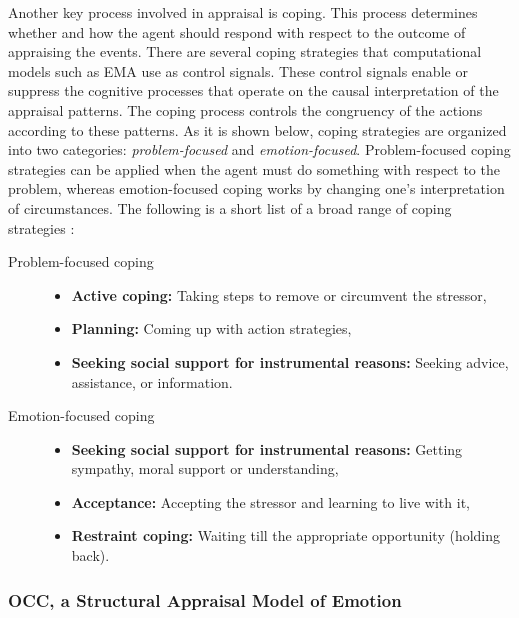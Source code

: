 \documentclass[12pt]{report}
\begin{document}
Another key process involved in appraisal is coping. This process determines
whether and how the agent should respond with respect to the outcome of
appraising the events. There are several coping strategies that computational
models such as EMA \cite{gratch:domain-independent} use as control signals.
These control signals enable or suppress the cognitive processes that operate on
the causal interpretation of the appraisal patterns. The coping process controls
the congruency of the actions according to these patterns. As it is shown below,
coping strategies are organized into two categories: \textit{problem-focused}
and \textit{emotion-focused}. Problem-focused coping strategies can be applied
when the agent must do something with respect to the problem, whereas
emotion-focused coping works by changing one's interpretation of circumstances.
The following is a short list of a broad range of coping strategies
\cite{gratch:domain-independent}:

\begin{description}
  \item[Problem-focused coping] \hfill
	\begin{itemize}
	  \item \textbf{Active coping:} Taking steps to remove or circumvent the
	  stressor,
	  \item \textbf{Planning:} Coming up with action strategies,
	  \item \textbf{Seeking social support for instrumental reasons:} Seeking
	  advice, assistance, or information.
	\end{itemize}
  \item[Emotion-focused coping] \hfill
    \begin{itemize}
	  \item \textbf{Seeking social support for instrumental reasons:} Getting
	  sympathy, moral support or understanding,
	  \item \textbf{Acceptance:} Accepting the stressor and learning to live with
	  it,
	  \item \textbf{Restraint coping:} Waiting till the appropriate opportunity
	  (holding back).
	\end{itemize}
\end{description}

\subsubsection{OCC, a Structural Appraisal Model of Emotion}
\end{document}
